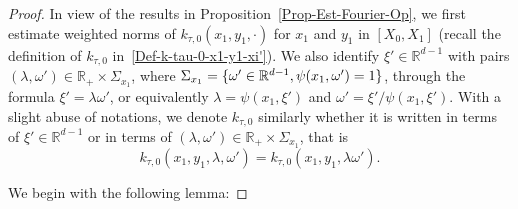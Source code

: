\documentclass[10pt]{amsart}
\theoremstyle{definition}\newtheorem{defi}[theo]{Definition}\newtheorem{rema}[theo]{Remark}\newtheorem{exam}[theo]{Example}\newtheorem{exem}[theo]{Example}\newtheorem{nota}[theo]{Notation}
\newcommand*\R{\mathbb{R}}
\begin{document}
\begin{proof}
In view of the results in Proposition~\ref{Prop-Est-Fourier-Op}, we first estimate weighted norms of $k_{\tau,0}(x_1, y_1, \cdot)$ for $x_1$ and $y_1$ in $[X_0,X_1]$ (recall the definition of $k_{\tau,0}$ in~\eqref{Def-k-tau-0-x1-y1-xi'}). We also identify $\xi' \in \R^{d-1}$ with pairs $(\lambda, \omega') \in \R_+ \times \Sigma_{x_1}$, where $\Sigma_{x_1} = \{ \omega' \in \R^{d-1}, \psi(x_1, \omega')\linebreak = 1\}$, through the formula $\xi' = \lambda \omega'$, or equivalently $\lambda = \psi(x_1,\xi')$ and $\omega' = \xi' /\psi(x_1,\xi')$. With a slight abuse of notations, we denote $k_{\tau,0}$ similarly whether it is written in terms of $\xi' \in \R^{d-1}$ or in terms of $(\lambda, \omega') \in \R_+ \times \Sigma_{x_1}$, that is
\[
k_{\tau,0}(x_1, y_1, \lambda, \omega') = k_{\tau,0}(x_1, y_1, \lambda \omega').
\]

We begin with the following lemma:


\end{proof}
\end{document}
